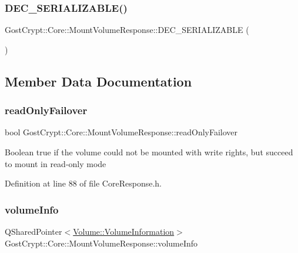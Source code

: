 \subsubsection{\texorpdfstring{D\+E\+C\+\_\+\+S\+E\+R\+I\+A\+L\+I\+Z\+A\+B\+L\+E()}{DEC\_SERIALIZABLE()}}
{\footnotesize\ttfamily Gost\+Crypt\+::\+Core\+::\+Mount\+Volume\+Response\+::\+D\+E\+C\+\_\+\+S\+E\+R\+I\+A\+L\+I\+Z\+A\+B\+LE (\begin{DoxyParamCaption}\item[{\hyperlink{struct_gost_crypt_1_1_core_1_1_mount_volume_response}{Mount\+Volume\+Response}}]{ }\end{DoxyParamCaption})}



\subsection{Member Data Documentation}
\mbox{\label{struct_gost_crypt_1_1_core_1_1_mount_volume_response_ac4729de73299e91d62aabfc1d1d4501b}} 
\subsubsection{\texorpdfstring{read\+Only\+Failover}{readOnlyFailover}}
{\footnotesize\ttfamily bool Gost\+Crypt\+::\+Core\+::\+Mount\+Volume\+Response\+::read\+Only\+Failover}

Boolean true if the volume could not be mounted with write rights, but succeed to mount in read-\/only mode 

Definition at line 88 of file Core\+Response.\+h.

\mbox{\label{struct_gost_crypt_1_1_core_1_1_mount_volume_response_a10c9eefc55df712ef0aa342016444299}} 
\subsubsection{\texorpdfstring{volume\+Info}{volumeInfo}}
{\footnotesize\ttfamily Q\+Shared\+Pointer$<$\hyperlink{struct_gost_crypt_1_1_volume_1_1_volume_information}{Volume\+::\+Volume\+Information}$>$ Gost\+Crypt\+::\+Core\+::\+Mount\+Volume\+Response\+::volume\+Info}


